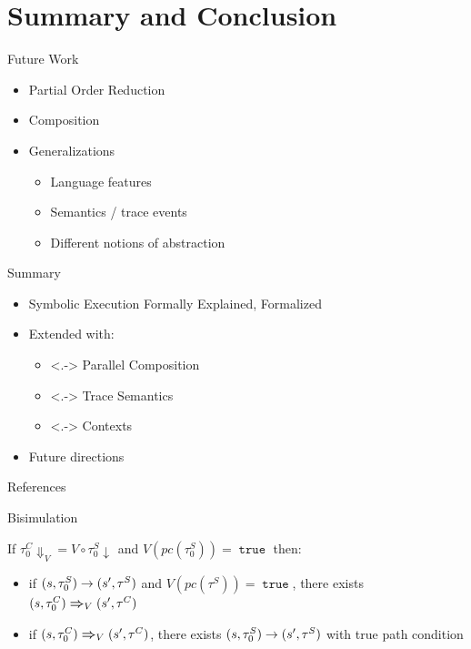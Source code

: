 \documentclass{beamer}
\DeclareMathOperator{\true}{\mathtt{true}}
\newcommand{\pc}[1]{\ensuremath{pc(#1)}}
\newcommand{\accC}[2][V_0]{\ensuremath{#2\Downarrow_{#1}}}
\newcommand{\accS}[2][]{\ensuremath{#2\downarrow_{#1}}}
\begin{document}
\section{Summary and Conclusion}

\begin{frame}{Future Work}
  \begin{itemize}[<+->]
    \item \alert{Partial Order Reduction}
    \item Composition
    \item Generalizations
          \begin{itemize}
            \item Language features
            \item Semantics / trace events
            \item Different notions of abstraction
          \end{itemize}
  \end{itemize}
\end{frame}

\begin{frame}{Summary}
  \begin{itemize}[<+->]
    \item Symbolic Execution Formally Explained, Formalized
    \item Extended with:
          \begin{itemize}
            \item<.-> Parallel Composition
            \item<.-> Trace Semantics
            \item<.-> Contexts
          \end{itemize}
    \item Future directions
  \end{itemize}
  \vfill{}
\end{frame}

\appendix
\begin{frame}{References}
  \printbibliography{}
\end{frame}

\begin{frame}{Bisimulation}
  \begin{theorem}[Bisimulation]
    If $\accC[V]{\tau^{C}_{0}} = V \circ\accS{\tau^{S}_{0}}$ and $V(\pc{\tau^{S}_{0}}) = \true$ then:
    \begin{itemize}
      \item if $\Sstep{(s, \tau^{S}_{0})}{(s', \tau^{S})}$ and $V(\pc{\tau^{S}}) = \true$, there exists $\Cstep[V]{(s, \tau^{C}_{0})}{(s', \tau^{C})}$
      \item if $\Cstep[V]{(s, \tau^{C}_{0})}{(s', \tau^{C})}$, there exists $\Sstep{(s, \tau^{S}_{0})}{(s', \tau^{S})}$
            with true path condition
    \end{itemize}
  \end{theorem}
\end{frame}
\end{document}
